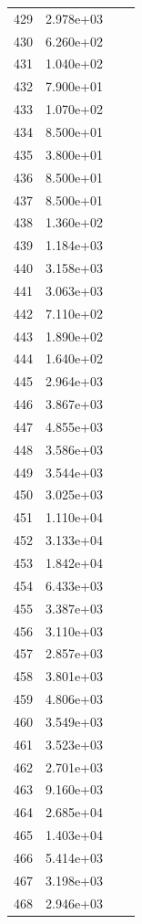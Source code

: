\documentclass[12pt]{article}
\begin{document}
\begin{longtable}{@{}cccc@{}}
429 & 2.978e+03 &  &  \\
430 & 6.260e+02 &  &  \\
431 & 1.040e+02 &  &  \\
432 & 7.900e+01 &  &  \\
433 & 1.070e+02 &  &  \\
434 & 8.500e+01 &  &  \\
435 & 3.800e+01 &  &  \\
436 & 8.500e+01 &  &  \\
437 & 8.500e+01 &  &  \\
438 & 1.360e+02 &  &  \\
439 & 1.184e+03 &  &  \\
440 & 3.158e+03 &  &  \\
441 & 3.063e+03 &  &  \\
442 & 7.110e+02 &  &  \\
443 & 1.890e+02 &  &  \\
444 & 1.640e+02 &  &  \\
445 & 2.964e+03 &  &  \\
446 & 3.867e+03 &  &  \\
447 & 4.855e+03 &  &  \\
448 & 3.586e+03 &  &  \\
449 & 3.544e+03 &  &  \\
450 & 3.025e+03 &  &  \\
451 & 1.110e+04 &  &  \\
452 & 3.133e+04 &  &  \\
453 & 1.842e+04 &  &  \\
454 & 6.433e+03 &  &  \\
455 & 3.387e+03 &  &  \\
456 & 3.110e+03 &  &  \\
457 & 2.857e+03 &  &  \\
458 & 3.801e+03 &  &  \\
459 & 4.806e+03 &  &  \\
460 & 3.549e+03 &  &  \\
461 & 3.523e+03 &  &  \\
462 & 2.701e+03 &  &  \\
463 & 9.160e+03 &  &  \\
464 & 2.685e+04 &  &  \\
465 & 1.403e+04 &  &  \\
466 & 5.414e+03 &  &  \\
467 & 3.198e+03 &  &  \\
468 & 2.946e+03 &  &  \\

\end{longtable}
\end{document}
